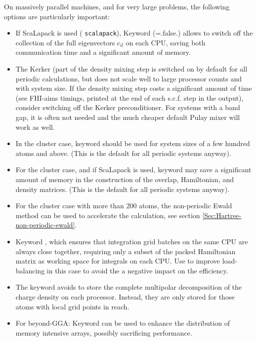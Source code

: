 On massively parallel machines, and for very large problems, the
following options are particularly important:
\begin{itemize}
  \item If ScaLapack is used (
    \texttt{scalapack}), Keyword 
    (=.false.) allows to switch off the collection of the full 
    eigenvectors $c_{il}$ on each CPU, saving both communication 
    time and a significant amount of memory.
  \item The Kerker  (part of the density
    mixing step is switched on by default for all periodic
    calculations, but does not scale well to large processor counts
    and with system size. If the density mixing step costs a
    significant amount of time (see FHI-aims timings, printed at
    the end of each s.c.f. step in the output), consider switching 
    off the Kerker preconditioner. For systems with a band gap, it
    is often not needed and the much cheaper default Pulay mixer 
    will work as well.
  \item In the cluster case, keyword  
    should be used for system sizes of a few hundred atoms and
    above. (This is the default for all periodic systems anyway). 
  \item For the cluster case, and if ScaLapack is used, keyword
     may save a significant amount of
    memory in the construction of the overlap, Hamiltonian, and density
    matrices. (This is the default for all periodic systems anyway).
  \item For the cluster case with more than 200 atoms, the non-periodic
    Ewald method can be used to accelerate the calculation, see
    section \ref{Sec:Hartree-non-periodic-ewald}.
  \item Keyword , which ensures that integration
    grid batches on the same CPU are always close together, requiring only a
    subset of the packed Hamiltonian matrix as working space for integrals on
    each CPU. Use  to improve load-balancing in this
    case to avoid the a negative impact on the efficiency.
  \item The keyword  avoids to store the
    complete multipolar decomposition of the charge density on each processor.
    Instead, they are only stored for those atoms with local grid points in
    reach.
  \item For beyond-GGA: Keyword  can be used to enhance
    the distribution of memory intensive arrays, possibly sacrificing
    performance.
\end{itemize}

